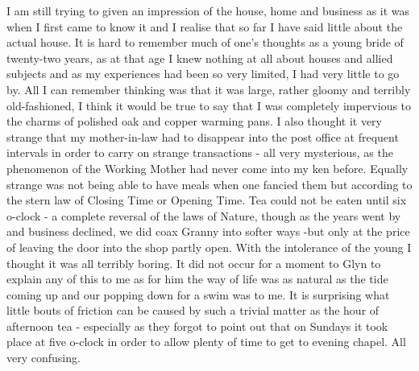 I am still trying to given an impression of the house, home and business as it was when I first came to know it and I realise that so far I have said little about the actual house. It is hard to remember much of one's thoughts as a young bride of twenty-two years, as at that age I knew nothing at all about houses and allied subjects and as my experiences had been so very limited, I had very little to go by. All I can remember thinking was that it was large, rather gloomy and terribly old-fashioned, I think it would be true to say that I was completely impervious to the charms of polished oak and copper warming pans. I also thought it very strange that my mother-in-law had to disappear into the post office at frequent intervals in order to carry on strange transactions - all very mysterious, as the phenomenon of the Working Mother had never come into my ken before. Equally strange was not being able to have meals when one fancied them but according to the stern law of Closing Time or Opening Time. Tea could not be eaten until six o-clock - a complete reversal of the laws of Nature, though as the years went by and business declined, we did coax Granny into softer ways -but only at the price of leaving the door into the shop partly open. With the intolerance of the young I thought it was all terribly boring. It did not occur for a moment to Glyn to explain any of this to me as for him the way of life was as natural as the tide coming up and our popping down for a swim was to me. It is surprising what little bouts of friction can be caused by such a trivial matter as the hour of afternoon tea - especially as they forgot to point out that on Sundays it took place at five o-clock in order to allow plenty of time to get to evening chapel. All very confusing.

